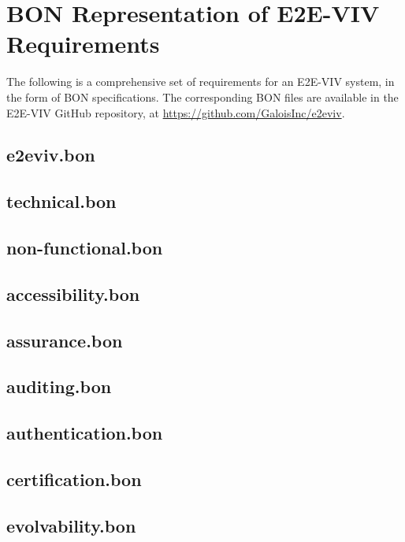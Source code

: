 \chapter{BON Representation of E2E-VIV Requirements}

The following is a comprehensive set of requirements for an E2E-VIV
system, in the form of BON specifications. The corresponding BON files
are available in the E2E-VIV GitHub repository, at
\url{https://github.com/GaloisInc/e2eviv}.

\section{e2eviv.bon}

\section{technical.bon}

\section{non-functional.bon}

\section{accessibility.bon}

\section{assurance.bon}

\section{auditing.bon}

\section{authentication.bon}

\section{certification.bon}

\section{evolvability.bon}

